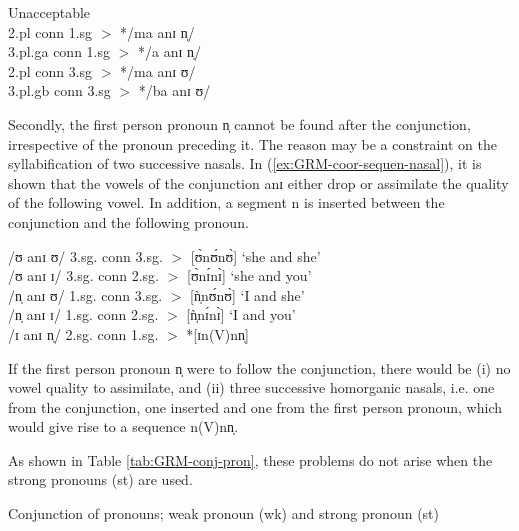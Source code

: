 \begin{exe}
\begin{exe}
\begin{exe}
{\begin{exe}
\begin{exe}
\begin{exe}
\begin{exe}
\begin{exe}
\begin{exe}
\begin{exe}
\begin{exe}
\begin{exe}
\begin{exe}
\begin{exe}
\begin{exe}
\begin{exe}
\begin{exe}
\begin{exe}
\begin{exe}
\begin{multicols}{2}
\ex\label{ex:GRM-conj-const-1-ng}{\rm Unacceptable}\\
2.pl {\sc conn} 1.sg  $>$ *{\sls /ma  anɪ n̩/}\\
3.pl.{\sc g}a   {\sc conn} 1.sg  $>$  *{\sls /a anɪ n̩/}\\
2.pl  {\sc conn} 3.sg $>$ */ma anɪ ʊ/\\
3.pl.{\sc g}b  {\sc conn} 3.sg $>$ *{\sls /ba anɪ ʊ/}\\

\z 
\end{multicols}
 \z

Secondly, the first person pronoun {\sls n̩} cannot be found after the 
conjunction, irrespective of the pronoun preceding it. The reason may be a 
constraint on the syllabification of two successive nasals.  In 
(\ref{ex:GRM-coor-sequen-nasal}), it is shown that the vowels of the 
conjunction 
{\sls anɪ} either  drop or assimilate the quality of the following vowel. In 
addition, a segment  {\sls n} is inserted between the conjunction and the 
following pronoun. 



\begin{exe}
 \ex\label{ex:GRM-coor-sequen-nasal}
/ʊ anɪ ʊ/   {\rm  3.sg.} {\sc conn}  {\rm   3.sg.} $>$ [ʊ̀nʊ́nʊ̀] {\rm  `she and she'}\\
/ʊ anɪ ɪ/   {\rm  3.sg.}  {\sc conn}  {\rm  2.sg.} $>$ [ʊ̀nɪ́nɪ̀]  {\rm   `she and you'}\\
/n̩ anɪ ʊ/   {\rm  1.sg.}  {\sc conn}  {\rm  3.sg.} $>$ [ǹ̩nʊ́nʊ̀] {\rm   `I and she'}\\
/n̩ anɪ ɪ/   {\rm  1.sg.}  {\sc conn}  {\rm  2.sg.} $>$ [ǹ̩nɪ́nɪ̀]  {\rm `I and you'}\\
/ɪ anɪ n̩/  {\rm   2.sg.}  {\sc conn}  {\rm  1.sg.} $>$ *[ɪn(V)nn̩]
\z



 If the first person pronoun {\sls n̩} were to follow the conjunction, there 
would 
be  (i) no vowel quality to assimilate, and (ii) three successive homorganic 
nasals, i.e. one from the conjunction, one inserted and one from the first 
person pronoun, which would give  rise to a sequence {\sls n(V)nn̩}. 

As shown in Table \ref{tab:GRM-conj-pron}, these problems do not arise when the 
strong pronouns ({\sc st}) are used. 



\begin{table}[htb!]
\small
 \caption[Conjunction of pronouns]{Conjunction of pronouns;  weak
pronoun ({\sc wk}) and   strong pronoun ({\sc st}) \label{tab:GRM-conj-pron}}


\end{table}
\end{exe}
\end{exe}
\end{exe}
\end{exe}
\end{exe}
\end{exe}
\end{exe}
\end{exe}
\end{exe}
\end{exe}
\end{exe}
\end{exe}
\end{exe}
\end{exe}
\end{exe}
\end{exe}
\end{exe}}
\end{exe}
\end{exe}
\end{exe}
